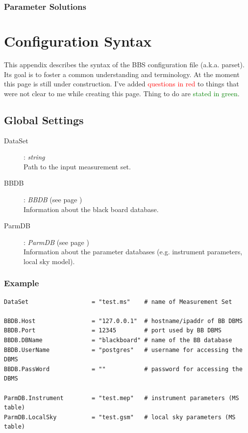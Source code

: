 \documentclass[10pt]{lofar}
\begin{document}
\subsubsection{Parameter Solutions}
\label{subsubsec:design-parmsolutions}

\pagebreak



\pagebreak

\appendix
\section{Configuration Syntax}

This appendix describes the syntax of the BBS configuration file (a.k.a.
parset). Its goal is to foster a common understanding and terminology. At the
moment this page is still under construction. I've added
\textcolor{red}{questions in red} to things that were not clear to me while
creating this page. Thing to do are \textcolor{green}{stated in green}.

\subsection*{Global Settings}
\begin{description}
\item [DataSet] : \emph{string} \\
    Path to the input measurement set.
\item [BBDB] : \emph{BBDB} (see page \pageref{app-bbdb}) \\
    Information about the black board database.
\item [ParmDB] : \emph{ParmDB} (see page \pageref{app-parmdb}) \\
    Information about the parameter databases (e.g. instrument parameters,
    local sky model).
\end{description}

\subsubsection*{Example}
{\footnotesize
\begin{verbatim}
DataSet                  = "test.ms"    # name of Measurement Set

BBDB.Host                = "127.0.0.1"  # hostname/ipaddr of BB DBMS
BBDB.Port                = 12345        # port used by BB DBMS
BBDB.DBName              = "blackboard" # name of the BB database
BBDB.UserName            = "postgres"   # username for accessing the DBMS
BBDB.PassWord            = ""           # password for accessing the DBMS

ParmDB.Instrument        = "test.mep"   # instrument parameters (MS table)
ParmDB.LocalSky          = "test.gsm"   # local sky parameters (MS table)
\end{verbatim}
}
\end{document}
